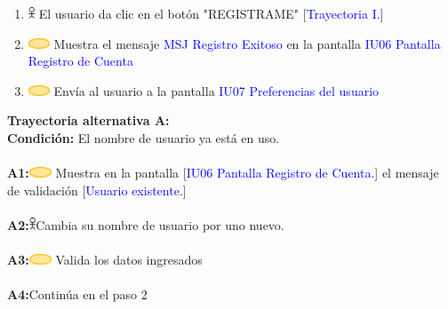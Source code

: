 \begin{enumerate}
                       \item \includegraphics[width=0.0150\textwidth]{Figuras/persona.png} El usuario da clic en el botón "REGISTRAME"  [\textcolor{blue}{Trayectoria I}.] 
                       \item \includegraphics[width=0.0500\textwidth]{Figuras/sistema.png} Muestra el mensaje \textcolor{blue}{MSJ
Registro Exitoso} en la pantalla \textcolor{blue}{IU06 Pantalla Registro de Cuenta}
                       \item \includegraphics[width=0.0500\textwidth]{Figuras/sistema.png} Envía al usuario a la pantalla \textcolor{blue}{IU07 Preferencias del usuario}

                    \end{enumerate}
                    
                    \textbf{Trayectoria alternativa A:}\\
                        \textbf{Condición:} El nombre de usuario ya está en uso.\\\\
                        \textbf{A1:}\includegraphics[width=0.0500\textwidth]{Figuras/sistema.png} Muestra en la pantalla [\textcolor{blue}{IU06 Pantalla Registro de Cuenta}.] el mensaje de validación [\textcolor{blue}{Usuario existente}.]  \\\\
                        \textbf{A2:}\includegraphics[width=0.0150\textwidth]{Figuras/persona.png}Cambia su nombre de usuario por uno nuevo.\\\\
                        \textbf{A3:}\includegraphics[width=0.0500\textwidth]{Figuras/sistema.png} Valida los datos ingresados\\\\
                        \textbf{A4:}Continúa en el paso 2 \\\\
       

